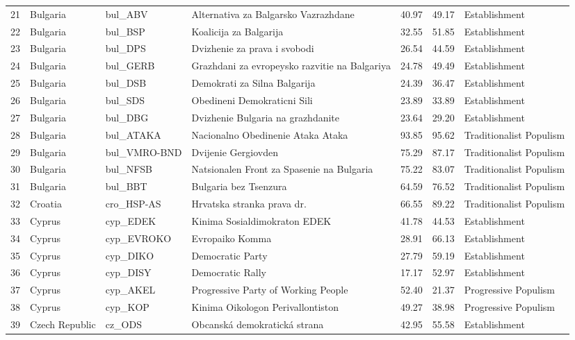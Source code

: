 \begin{longtable}[c]{@{\extracolsep{\fill}}rlllrrl}
		21 & Bulgaria & bul\_ABV & Alternativa za Balgarsko Vazrazhdane & 40.97 & 49.17 & Establishment \\
		22 & Bulgaria & bul\_BSP & Koalicija za Balgarija & 32.55 & 51.85 & Establishment \\
		23 & Bulgaria & bul\_DPS & Dvizhenie za prava i svobodi & 26.54 & 44.59 & Establishment \\
		24 & Bulgaria & bul\_GERB & Grazhdani za evropeysko razvitie na Balgariya & 24.78 & 49.49 & Establishment \\
		25 & Bulgaria & bul\_DSB & Demokrati za Silna Balgarija & 24.39 & 36.47 & Establishment \\
		26 & Bulgaria & bul\_SDS & Obedineni Demokraticni Sili & 23.89 & 33.89 & Establishment \\
		27 & Bulgaria & bul\_DBG & Dvizhenie Bulgaria na grazhdanite & 23.64 & 29.20 & Establishment \\
		28 & Bulgaria & bul\_ATAKA & Nacionalno Obedinenie Ataka Ataka & 93.85 & 95.62 & Traditionalist Populism \\
		29 & Bulgaria & bul\_VMRO-BND & Dvijenie Gergiovden & 75.29 & 87.17 & Traditionalist Populism \\
		30 & Bulgaria & bul\_NFSB & Natsionalen Front za Spasenie na Bulgaria & 75.22 & 83.07 & Traditionalist Populism \\
		31 & Bulgaria & bul\_BBT & Bulgaria bez Tsenzura & 64.59 & 76.52 & Traditionalist Populism \\
		32 & Croatia & cro\_HSP-AS & Hrvatska stranka prava dr. & 66.55 & 89.22 & Traditionalist Populism \\
		33 & Cyprus & cyp\_EDEK & Kinima Sosialdimokraton EDEK & 41.78 & 44.53 & Establishment \\
		34 & Cyprus & cyp\_EVROKO & Evropaiko Komma & 28.91 & 66.13 & Establishment \\
		35 & Cyprus & cyp\_DIKO & Democratic Party & 27.79 & 59.19 & Establishment \\
		36 & Cyprus & cyp\_DISY & Democratic Rally & 17.17 & 52.97 & Establishment \\
		37 & Cyprus & cyp\_AKEL & Progressive Party of Working People & 52.40 & 21.37 & Progressive Populism \\
		38 & Cyprus & cyp\_KOP & Kinima Oikologon Perivallontiston & 49.27 & 38.98 & Progressive Populism \\
		39 & Czech Republic & cz\_ODS & Obcanská demokratická strana & 42.95 & 55.58 & Establishment \\

\end{longtable}
